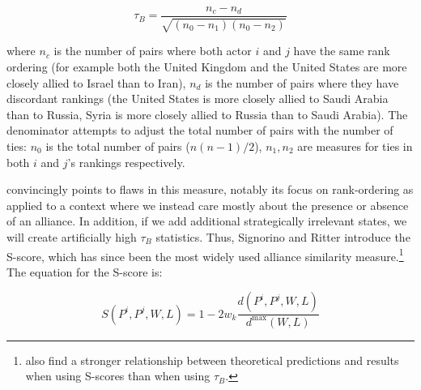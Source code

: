  \begin{equation}
	 \tau_{B} = \frac{n_{c} - n_{d}}{\sqrt{(n_{0} - n_{1})(n_{0} - n_{2})}}
 \end{equation}
 
 \noindent where $n_{c}$ is the number of pairs where both actor $i$ and $j$ have the same rank ordering (for example both the United Kingdom and the United States are more closely allied to Israel than to Iran), $n_{d}$ is the number of pairs where they have discordant rankings (the United States is more closely allied to Saudi Arabia than to Russia, Syria is more closely allied to Russia than to Saudi Arabia). The denominator attempts to adjust the total number of pairs with the number of ties: $n_{0}$ is the total number of pairs ($n(n-1)/2$), $n_{1}, n_{2}$ are measures for ties in both $i$ and $j$'s rankings respectively.
 
\citet{signorino:ritter:1999} convincingly points to flaws in this measure, notably its focus on rank-ordering as applied to a context where we instead care mostly about the presence or absence of an alliance. In addition, if we add additional strategically irrelevant states, we will create artificially high $\tau_{B}$ statistics. Thus, Signorino and Ritter introduce the S-score, which has since been the most widely used alliance similarity measure.\footnote{\citet{bennett:rupert:2003} also find a stronger relationship between theoretical predictions and results when using S-scores than when using $\tau_{B}$.} The equation for the S-score is:

\begin{equation}
	S(P^i, P^j, W, L) = 1 - 2w_k \frac{d(P^i, P^j, W, L)}{d^{\text{max}}(W,L)}
\end{equation}

